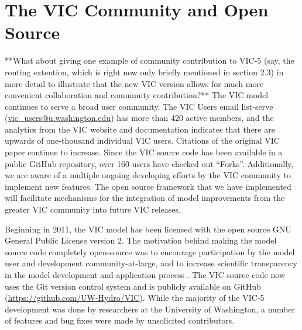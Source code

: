 \documentclass[gmd, manuscript]{copernicus}
\begin{document}
  \section{The VIC Community and Open Source}
    \label{sec:vic_community}
	**What about giving one example of community contribution to VIC-5 (say, the routing extention, which is right now only briefly mentioned in section 2.3) in more detail to illustrate that the new VIC version allows for much more convenient collaboration and community contribution?**
    The VIC model continues to serve a broad user community. The VIC Users email list-serve (\url{vic_users@u.washington.edu}) has more than 420 active members, and the analytics from the VIC website and documentation indicates that there are upwards of one-thousand individual VIC users. Citations of the original VIC paper \citep{Liang_1994} continue to increase. Since the VIC source code has been available in a public GitHub repository, over 160 users have checked out ``Forks''. Additionally, we are aware of a multiple ongoing developing efforts by the VIC community to implement new features. The open source framework that we have implemented will facilitate mechanisms for the integration of model improvements from the greater VIC community into future VIC releases.

    Beginning in 2011, the VIC model has been licensed with the open source GNU General Public License version 2. The motivation behind making the model source code completely open-source was to encourage participation by the model user and development community-at-large, and to increase scientific transparency in the model development and application process \citep{Ince_2012}. The VIC source code now uses the Git version control system \citep{Torvalds_2010} and is publicly available on GitHub (\url{https://github.com/UW-Hydro/VIC}). While the majority of the VIC-5 development was done by researchers at the University of Washington, a number of features and bug fixes were made by unsolicited contributors.
\end{document}

